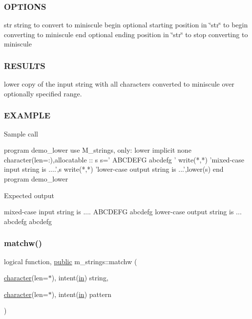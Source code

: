 \subsubsection*{O\+P\+T\+I\+O\+NS}

str string to convert to miniscule begin optional starting position in \char`\"{}str\char`\"{} to begin converting to miniscule end optional ending position in \char`\"{}str\char`\"{} to stop converting to miniscule

\subsubsection*{R\+E\+S\+U\+L\+TS}

lower copy of the input string with all characters converted to miniscule over optionally specified range.

\subsubsection*{E\+X\+A\+M\+P\+LE}

\begin{DoxyVerb}Sample call

   program demo_lower
   use M_strings, only: lower
   implicit none
   character(len=:),allocatable  :: s
      s=' ABCDEFG abcdefg '
      write(*,*) 'mixed-case input string is ....',s
      write(*,*) 'lower-case output string is ...',lower(s)
   end program demo_lower

Expected output

   mixed-case input string is .... ABCDEFG abcdefg
   lower-case output string is ... abcdefg abcdefg \end{DoxyVerb}
 \mbox{\label{namespacem__strings_a1f9a363d0432f7373ef6a388f5893b0e}} 
\subsubsection{\texorpdfstring{matchw()}{matchw()}}
{\footnotesize\ttfamily logical function, \hyperlink{M__stopwatch_83_8txt_a2f74811300c361e53b430611a7d1769f}{public} m\+\_\+strings\+::matchw (\begin{DoxyParamCaption}\item[{\hyperlink{option__stopwatch_83_8txt_abd4b21fbbd175834027b5224bfe97e66}{character}(len=$\ast$), intent(\hyperlink{M__journal_83_8txt_afce72651d1eed785a2132bee863b2f38}{in})}]{string,  }\item[{\hyperlink{option__stopwatch_83_8txt_abd4b21fbbd175834027b5224bfe97e66}{character}(len=$\ast$), intent(\hyperlink{M__journal_83_8txt_afce72651d1eed785a2132bee863b2f38}{in})}]{pattern }\end{DoxyParamCaption})}



